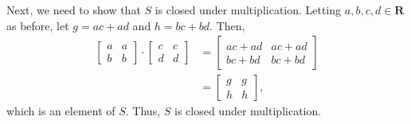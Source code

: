 \documentclass[10pt]{extarticle}
\begin{document}
\begin{enumerate}[(a)]
      Next, we need to show that $S$ is closed under multiplication. Letting $a,b,c,d\in \mathbf{R}$ as before, let $g = ac+ad$ and $h = bc+bd$. Then,
      \begin{align*}
        \begin{bmatrix}a&a\\b&b\end{bmatrix} \cdot \begin{bmatrix}c&c\\d&d\end{bmatrix} &= \begin{bmatrix}ac+ad & ac+ad\\bc+bd & bc+bd\end{bmatrix}\\
                        &= \begin{bmatrix}g&g\\h&h\end{bmatrix},
      \end{align*}
      which is an element of $S$. Thus, $S$ is closed under multiplication.\\


\end{enumerate}
\end{document}
